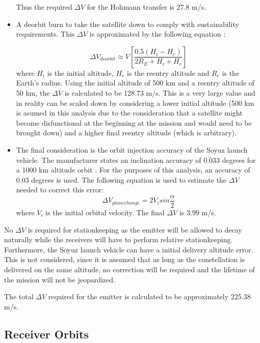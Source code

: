 \begin{itemize}
		Thus the required $\Delta V$ for the Hohmann transfer is 27.8 m/s.
	\item A deorbit burn to take the satellite down to comply with sustainability requirements. This $\Delta V$ is approximated by the following equation \cite{constDesign}:
	
	\begin{equation}
			\Delta V_{deorbit} \approx V \left[ \frac{0.5(H_i - H_e)}{2R_E + H_i + H_e} \right]
		\end{equation}
	where $H_i$ is the initial altitude, $H_e$ is the reentry altitude and $R_e$ is the Earth's radius. Using the initial altitude of 500 km and a reentry altitude of 50 km, the $\Delta V$ is calculated to be 128.73 m/s. This is a very large value and in reality can be scaled down by considering a lower initial altitude (500 km is asumed in this analysis due to the consideration that a satellite might become disfunctional at the beginning at the mission and would need to be brought down) and a higher final reentry altitude (which is arbitrary). 
	
	\item The final consideration is the orbit injection accuracy of the Soyuz launch vehicle. The manufacturer states an inclination accuracy of 0.033 degrees for a 1000 km altitude orbit \cite{soyuzman}. For the purposes of this analysis, an accuracy of 0.03 degrees is used. The following equation is used to estimate the $\Delta V$ needed to correct this error:
	\begin{equation}
			\Delta V_{plane change} = 2V_i sin \frac{\alpha}{2}
		\end{equation}
	  where $V_i$ is the initial orbital velocity. The final $\Delta V$ is 3.99 m/s.
\end{itemize}

No $\Delta V$ is required for stationkeeping as the emitter will be allowed to decay naturally while the receivers will have to perform relative stationkeeping. Furthermore, the Soyuz launch vehicle can have a initial delivery altitude error. This is not considered, since it is assumed that as long as the constellation is delivered on the same altitude, no correction will be required and the lifetime of the mission will not be jeopardized. 

The total $\Delta V$ required for the emitter is calculated to be approximately 225.38 m/s.




\subsection{Receiver Orbits}
\label{frSSRO}

